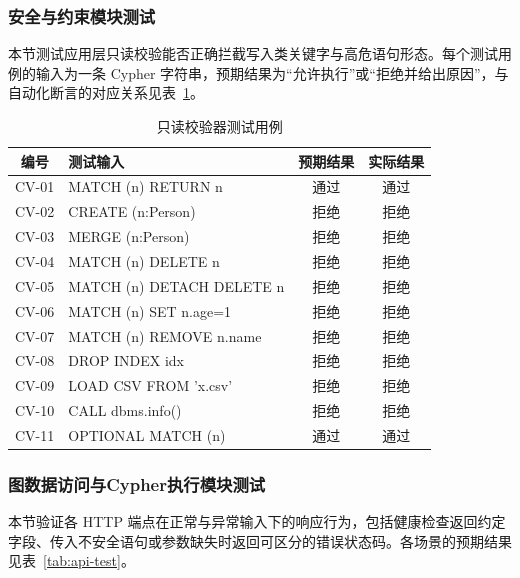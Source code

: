 \documentclass[12pt,a4paper]{article}
\begin{document}
\subsubsection{安全与约束模块测试}

本节测试应用层只读校验能否正确拦截写入类关键字与高危语句形态。每个测试用例的输入为一条 Cypher 字符串，预期结果为``允许执行''或``拒绝并给出原因''，与自动化断言的对应关系见表~\ref{tab:readonly-test}。

\begin{table}[H]
    \centering
    \caption{只读校验器测试用例}
    \label{tab:readonly-test}
    \begin{tabular}{clcc}
        \toprule
        编号 & 测试输入 & 预期结果 & 实际结果 \\
        \midrule
        CV-01 & MATCH (n) RETURN n & 通过 & 通过 \\
        CV-02 & CREATE (n:Person) & 拒绝 & 拒绝 \\
        CV-03 & MERGE (n:Person) & 拒绝 & 拒绝 \\
        CV-04 & MATCH (n) DELETE n & 拒绝 & 拒绝 \\
        CV-05 & MATCH (n) DETACH DELETE n & 拒绝 & 拒绝 \\
        CV-06 & MATCH (n) SET n.age=1 & 拒绝 & 拒绝 \\
        CV-07 & MATCH (n) REMOVE n.name & 拒绝 & 拒绝 \\
        CV-08 & DROP INDEX idx & 拒绝 & 拒绝 \\
        CV-09 & LOAD CSV FROM 'x.csv' & 拒绝 & 拒绝 \\
        CV-10 & CALL dbms.info() & 拒绝 & 拒绝 \\
        CV-11 & OPTIONAL MATCH (n) & 通过 & 通过 \\
        \bottomrule
    \end{tabular}
\end{table}

\subsubsection{图数据访问与Cypher执行模块测试}

本节验证各 HTTP 端点在正常与异常输入下的响应行为，包括健康检查返回约定字段、传入不安全语句或参数缺失时返回可区分的错误状态码。各场景的预期结果见表~\ref{tab:api-test}。
\end{document}
